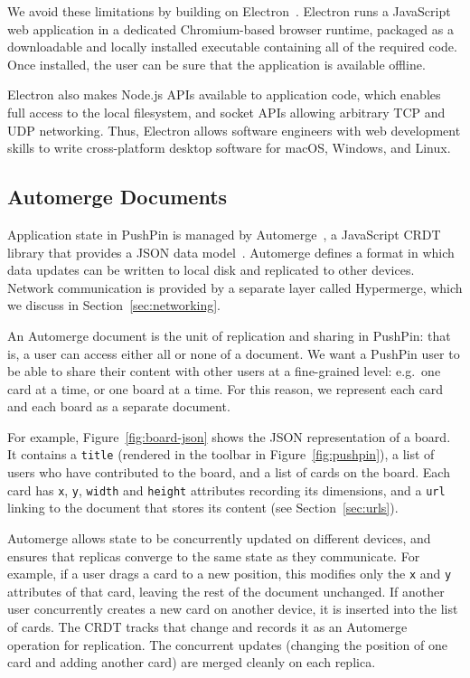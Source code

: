\documentclass[sigplan,10pt]{acmart}
\begin{document}
We avoid these limitations by building on Electron~\cite{Electron}.
Electron runs a JavaScript web application in a dedicated Chromium-based browser runtime, packaged as a downloadable and locally installed executable containing all of the required code.
Once installed, the user can be sure that the application is available offline.

Electron also makes Node.js APIs available to application code, which enables full access to the local filesystem, and socket APIs allowing arbitrary TCP and UDP networking.
Thus, Electron allows software engineers with web development skills to write cross-platform desktop software for macOS, Windows, and Linux.

\subsection{Automerge Documents}\label{sec:documents}

Application state in PushPin is managed by Automerge~\cite{Automerge:2018,Automerge,LocalFirst}, a JavaScript CRDT library that provides a JSON data model~\cite{Kleppmann:2017ca}.
Automerge defines a format in which data updates can be written to local disk and replicated to other devices.
Network communication is provided by a separate layer called Hypermerge, which we discuss in Section~\ref{sec:networking}.

An Automerge document is the unit of replication and sharing in PushPin: that is, a user can access either all or none of a document.
We want a PushPin user to be able to share their content with other users at a fine-grained level: e.g.\ one card at a time, or one board at a time.
For this reason, we represent each card and each board as a separate document.

For example, Figure~\ref{fig:board-json} shows the JSON representation of a board.
It contains a \texttt{title} (rendered in the toolbar in Figure~\ref{fig:pushpin}), a list of users who have contributed to the board, and a list of cards on the board.
Each card has \texttt{x}, \texttt{y}, \texttt{width} and \texttt{height} attributes recording its dimensions, and a \texttt{url} linking to the document that stores its content (see Section~\ref{sec:urls}).

Automerge allows state to be concurrently updated on different devices, and ensures that replicas converge to the same state as they communicate.
For example, if a user drags a card to a new position, this modifies only the \texttt{x} and \texttt{y} attributes of that card, leaving the rest of the document unchanged.
If another user concurrently creates a new card on another device, it is inserted into the list of cards.
The CRDT tracks that change and records it as an Automerge operation for replication.
The concurrent updates (changing the position of one card and adding another card) are merged cleanly on each replica.
\end{document}
